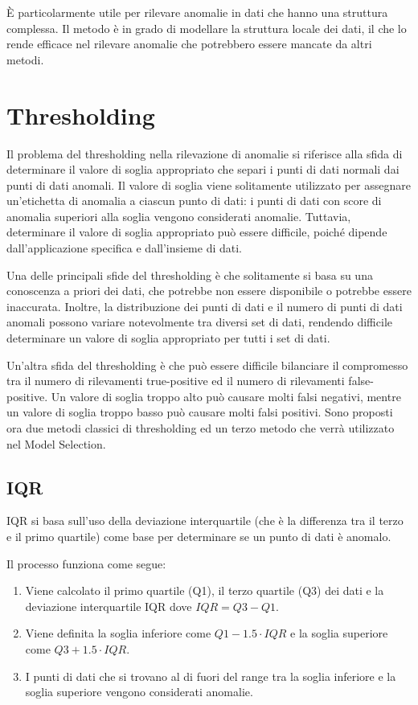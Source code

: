  È particolarmente utile per rilevare anomalie in dati che hanno una struttura complessa. Il metodo è in grado di modellare la struttura locale dei dati, il che lo rende efficace nel rilevare anomalie che potrebbero essere mancate da altri metodi.




\section{Thresholding}
Il problema del thresholding nella rilevazione di anomalie si riferisce alla sfida di determinare il valore di soglia appropriato che separi i punti di dati normali dai punti di dati anomali. Il valore di soglia viene solitamente utilizzato per assegnare un'etichetta di anomalia a ciascun punto di dati: i punti di dati con score di anomalia superiori alla soglia vengono considerati anomalie. Tuttavia, determinare il valore di soglia appropriato può essere difficile, poiché dipende dall'applicazione specifica e dall'insieme di dati.

Una delle principali sfide del thresholding è che solitamente si basa su una conoscenza a priori dei dati, che potrebbe non essere disponibile o potrebbe essere inaccurata. Inoltre, la distribuzione dei punti di dati e il numero di punti di dati anomali possono variare notevolmente tra diversi set di dati, rendendo difficile determinare un valore di soglia appropriato per tutti i set di dati.

Un'altra sfida del thresholding è che può essere difficile bilanciare il compromesso tra il numero di rilevamenti true-positive ed il numero di rilevamenti false-positive. Un valore di soglia troppo alto può causare molti falsi negativi, mentre un valore di soglia troppo basso può causare molti falsi positivi.
Sono proposti ora due metodi classici di thresholding ed un terzo metodo che verrà utilizzato nel Model Selection.

\subsection{IQR}
IQR \cite{https://doi.org/10.48550/arxiv.1509.02473} si basa sull'uso della deviazione interquartile (che è la differenza tra il terzo e il primo quartile) come base per determinare se un punto di dati è anomalo.

Il processo funziona come segue:
\begin{enumerate}
\item Viene calcolato il primo quartile (Q1), il terzo quartile (Q3) dei dati e la deviazione interquartile IQR dove $IQR = Q3-Q1$.
\item Viene definita la soglia inferiore come $Q1 - 1.5 \cdot IQR$ e la soglia superiore come $Q3 + 1.5 \cdot IQR$.
\item I punti di dati che si trovano al di fuori del range tra la soglia inferiore e la soglia superiore vengono considerati anomalie.
\end{enumerate}

